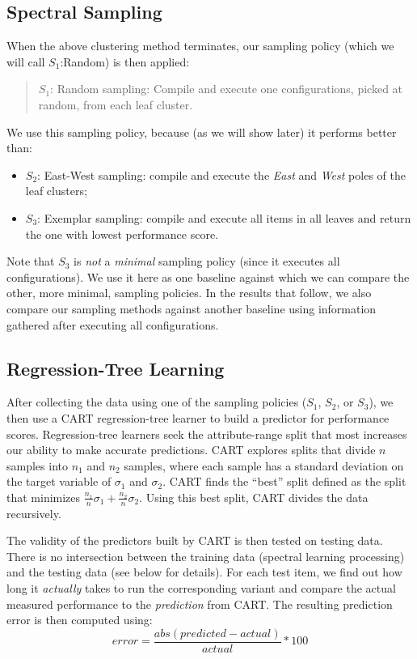 \documentclass{sig-alternative}
\newcommand{\bi}{\begin{itemize}}%
\newcommand{\ei}{\end{itemize}}
\begin{document}
\subsection{Spectral Sampling}\label{sect:sample}
When the above clustering method terminates, our  sampling policy (which we will call $S_1$:Random) is then applied:
\begin{quote}
$S_1$: Random sampling: Compile and execute one  configurations,  picked at random, from each leaf cluster.
\end{quote}
We use this sampling policy, because (as we will show later) it performs better than:
\bi
\item $S_2$: East-West sampling: compile and execute the {\em East} and {\em West} poles of the leaf clusters;
\item $S_3$: Exemplar sampling: compile and execute all items in all leaves and return the one
with lowest performance score.
\ei
Note that $S_3$ is {\em not} a {\em minimal} sampling policy (since it executes all configurations). 
We use it here as one  baseline
against which we can compare the other, more minimal, sampling policies. In the results
that follow, we also compare our 
sampling methods against another baseline using information gathered after executing
all configurations.

\subsection{Regression-Tree Learning}
After collecting the data using one of the sampling policies ($S_1$, $S_2$, or $S_3$), we then use a CART regression-tree learner \cite{breiman1984} to build a predictor for performance scores. Regression-tree learners seek the attribute-range split that most increases
our ability to make accurate predictions.
CART explores splits that divide $n$ samples  into  $n_1$ and $n_2$ samples, where each sample  has a  standard deviation on the target variable of $\sigma_1$ and  $\sigma_2$.
CART finds the ``best'' split defined as the split that minimizes $\frac{n_1}{n}\sigma_1 + \frac{n_2}{n}\sigma_2$.
Using this best split, CART divides the data recursively.
 

The validity of the predictors built by CART is then tested on testing data. There is no intersection between the training data (spectral learning processing) and the testing data (see below for details). 
For each  test item, we find out how long it {\em actually} takes to run the corresponding variant and compare the actual measured performance to the {\em prediction} from CART. The resulting prediction error is then computed using:
\begin{equation}\label{eq:err}
\mathit{error}=\frac{\mathit{abs}(\mathit{predicted} - \mathit{actual})}{\mathit{actual}}*100
\end{equation}
\end{document}
